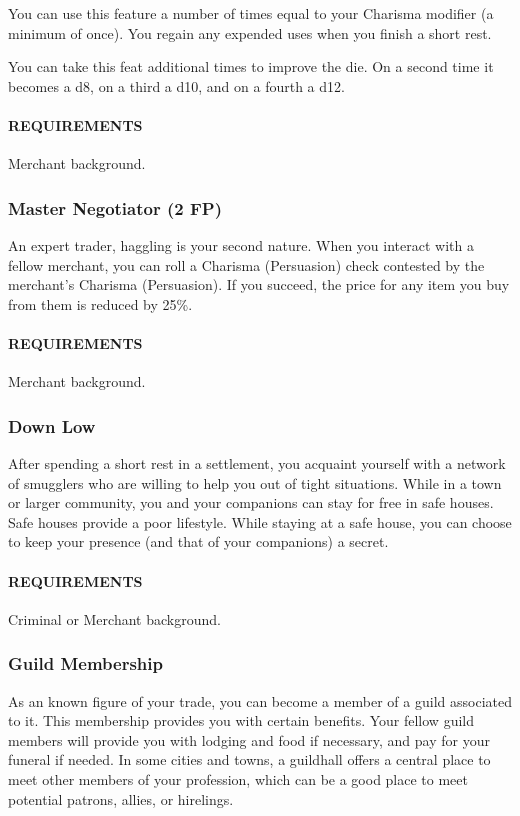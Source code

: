         You can use this feature a number of times equal to your Charisma modifier (a minimum of once).
        You regain any expended uses when you finish a short rest.

        You can take this feat additional times to improve the die.
        On a second time it becomes a d8, on a third a d10, and on a fourth a d12.
        \paragraph{REQUIREMENTS} Merchant background.

    \subsubsection{Master Negotiator (2 FP)} \label{feat::masternegotiator}
        An expert trader, haggling is your second nature.
        When you interact with a fellow merchant, you can roll a Charisma (Persuasion) check contested by the merchant's Charisma (Persuasion).
        If you succeed, the price for any item you buy from them is reduced by 25\%.
        \paragraph{REQUIREMENTS} Merchant background.

    \subsubsection{Down Low} \label{feat::downlow}
        After spending a short rest in a settlement, you acquaint yourself with a network of smugglers who are willing to help you out of tight situations.
        While in a town or larger community, you and your companions can stay for free in safe houses.
        Safe houses provide a poor lifestyle.
        While staying at a safe house, you can choose to keep your presence (and that of your companions) a secret.
        \paragraph{REQUIREMENTS} Criminal or Merchant background.

    \subsubsection{Guild Membership} \label{feat::guildmembership}
        As an known figure of your trade, you can become a member of a guild associated to it.
        This membership provides you with certain benefits.
        Your fellow guild members will provide you with lodging and food if necessary, and pay for your funeral if needed.
        In some cities and towns, a guildhall offers a central place to meet other members of your profession, which can be a good place to meet potential patrons, allies, or hirelings.

